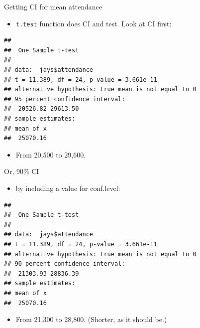 \documentclass[
  ignorenonframetext,
]{beamer}
\newenvironment{Shaded}{\begin{snugshade}}{\end{snugshade}}
\newcommand{\DataTypeTok}[1]{\textcolor[rgb]{0.13,0.29,0.53}{#1}}
\newcommand{\FloatTok}[1]{\textcolor[rgb]{0.00,0.00,0.81}{#1}}
\newcommand{\KeywordTok}[1]{\textcolor[rgb]{0.13,0.29,0.53}{\textbf{#1}}}
\newcommand{\NormalTok}[1]{#1}
\newcommand{\OperatorTok}[1]{\textcolor[rgb]{0.81,0.36,0.00}{\textbf{#1}}}
\providecommand{\tightlist}{%
  \setlength{\itemsep}{0pt}\setlength{\parskip}{0pt}}
\begin{document}
\begin{frame}[fragile]{Getting CI for mean attendance}
\protect\hypertarget{getting-ci-for-mean-attendance}{}

\begin{itemize}
\tightlist
\item
  \texttt{t.test} function does CI and test. Look at CI first:
\end{itemize}

\begin{Shaded}
\end{Shaded}

\begin{verbatim}
## 
##  One Sample t-test
## 
## data:  jays$attendance
## t = 11.389, df = 24, p-value = 3.661e-11
## alternative hypothesis: true mean is not equal to 0
## 95 percent confidence interval:
##  20526.82 29613.50
## sample estimates:
## mean of x 
##  25070.16
\end{verbatim}

\begin{itemize}
\tightlist
\item
  From 20,500 to 29,600.
\end{itemize}

\end{frame}

\begin{frame}[fragile]{Or, 90\% CI}
\protect\hypertarget{or-90-ci}{}

\begin{itemize}
\tightlist
\item
  by including a value for conf.level:
\end{itemize}

\begin{Shaded}
\end{Shaded}

\begin{verbatim}
## 
##  One Sample t-test
## 
## data:  jays$attendance
## t = 11.389, df = 24, p-value = 3.661e-11
## alternative hypothesis: true mean is not equal to 0
## 90 percent confidence interval:
##  21303.93 28836.39
## sample estimates:
## mean of x 
##  25070.16
\end{verbatim}

\begin{itemize}
\tightlist
\item
  From 21,300 to 28,800. (Shorter, as it should be.)
\end{itemize}

\end{frame}
\end{document}
